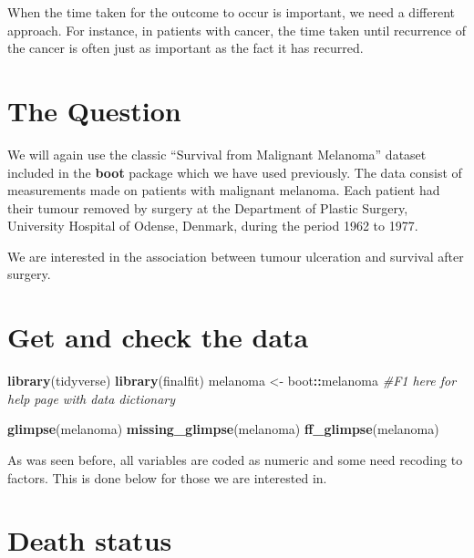 \documentclass[
  12pt,
  krantz2]{krantz}
\makeatletter
\newenvironment{Shaded}{\begin{snugshade}}{\end{snugshade}}
\newcommand{\CommentTok}[1]{\textcolor[rgb]{0.56,0.35,0.01}{\textit{#1}}}
\newcommand{\KeywordTok}[1]{\textcolor[rgb]{0.13,0.29,0.53}{\textbf{#1}}}
\newcommand{\NormalTok}[1]{#1}
\newcommand{\OperatorTok}[1]{\textcolor[rgb]{0.81,0.36,0.00}{\textbf{#1}}}
\newcommand{\StringTok}[1]{\textcolor[rgb]{0.31,0.60,0.02}{#1}}
\newenvironment{kframe}{%
\medskip{}
\setlength{\fboxsep}{.8em}
 \def\at@end@of@kframe{}%
 \ifinner\ifhmode%
  \def\at@end@of@kframe{\end{minipage}}%
  \begin{minipage}{\columnwidth}%
 \fi\fi%
 \def\FrameCommand##1{\hskip\@totalleftmargin \hskip-\fboxsep
 \colorbox{shadecolor}{##1}\hskip-\fboxsep
     \hskip-\linewidth \hskip-\@totalleftmargin \hskip\columnwidth}%
 \MakeFramed {\advance\hsize-\width
   \@totalleftmargin\z@ \linewidth\hsize
   \@setminipage}}%
 {\par\unskip\endMakeFramed%
 \at@end@of@kframe}
\renewenvironment{Shaded}{\begin{kframe}}{\end{kframe}}
\makeatother
\begin{document}
When the time taken for the outcome to occur is important, we need a different approach.
For instance, in patients with cancer, the time taken until recurrence of the cancer is often just as important as the fact it has recurred.

\hypertarget{the-question-5}{%
\section{The Question}\label{the-question-5}}

We will again use the classic ``Survival from Malignant Melanoma'' dataset included in the \textbf{boot} package which we have used previously.
The data consist of measurements made on patients with malignant melanoma.
Each patient had their tumour removed by surgery at the Department of Plastic Surgery, University Hospital of Odense, Denmark, during the period 1962 to 1977.

We are interested in the association between tumour ulceration and survival after surgery.

\hypertarget{get-and-check-the-data}{%
\section{Get and check the data}\label{get-and-check-the-data}}

\begin{Shaded}
\begin{Highlighting}[]
\KeywordTok{library}\NormalTok{(tidyverse)}
\KeywordTok{library}\NormalTok{(finalfit)}
\NormalTok{melanoma <-}\StringTok{ }\NormalTok{boot}\OperatorTok{::}\NormalTok{melanoma }\CommentTok{#F1 here for help page with data dictionary}
\end{Highlighting}
\end{Shaded}

\begin{Shaded}
\begin{Highlighting}[]
\KeywordTok{glimpse}\NormalTok{(melanoma)}
\KeywordTok{missing_glimpse}\NormalTok{(melanoma)}
\KeywordTok{ff_glimpse}\NormalTok{(melanoma)}
\end{Highlighting}
\end{Shaded}

As was seen before, all variables are coded as numeric and some need recoding to factors.
This is done below for those we are interested in.

\hypertarget{death-status}{%
\section{Death status}\label{death-status}}
\end{document}
